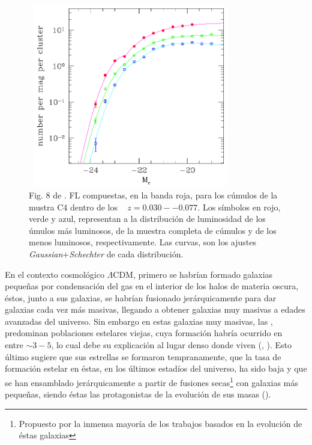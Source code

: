 \begin{figure}[H]
\centering
 \includegraphics[height=8cm, width=9cm]{Figures/lin2010.png}
 \caption{
 Fig. 8 de \cite{lin10}. FL compuestas, en la banda roja, para los c\'umulos de la
 mustra C4 dentro de los \z~ $z=0.030--0.077$.
 Los s\'imbolos en rojo, verde y azul, representan a la distribuci\'on de luminosidad
 de los \'umulos m\'as luminosos, de la muestra completa de c\'umulos y de los menos luminosos,
 respectivamente. Las curvas, son los ajustes \textit{Gaussian$+$Schechter} de cada distribuci\'on.}
 \label{fig:lin2010}
\end{figure}


En el contexto cosmol\'ogico $\Lambda$CDM,
primero se habr\'ian formado galaxias peque\~nas por condensaci\'on
del gas en el interior de los halos de materia oscura, \'estos,
junto a sus galaxias, se habr\'ian fusionado jer\'arquicamente para dar galaxias
cada vez m\'as masivas, llegando a obtener galaxias muy masivas a edades avanzadas del universo.
Sin embargo en estas galaxias muy masivas, las \bcgs,
predominan poblaciones estelares viejas, cuya formaci\'on habr\'ia ocurrido en \z~
entre $\sim3-5$, lo cual debe su explicaci\'on al lugar denso donde viven (\cite{tho05}, \cite{jim07}).
Esto \'ultimo sugiere que sus estrellas se formaron tempranamente,
que la tasa de formaci\'on estelar en \'estas, en los \'ultimos estad\'ios del universo, ha sido
baja y que se han ensamblado jer\'arquicamente a partir de fusiones secas\footnote{Propuesto por la inmensa mayor\'ia
de los trabajos basados en la evoluci\'on de \'estas galaxias} con galaxias
m\'as peque\~nas, siendo \'estas las protagonistas
de la evoluci\'on de sus masas (\cite{del07}).

